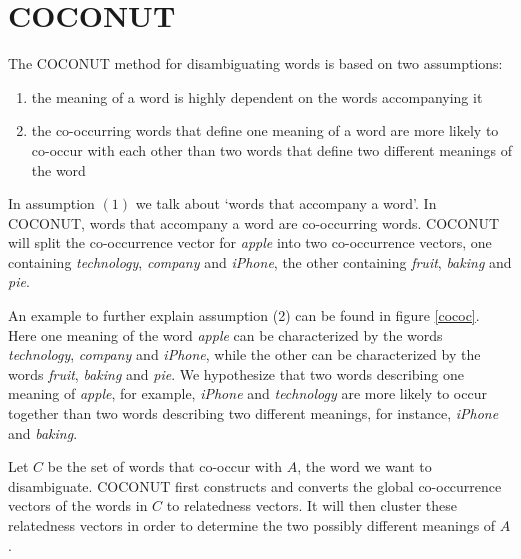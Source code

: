 \documentclass[11pt]{article}
\begin{document}
\section{COCONUT}
\label{anouk}
The COCONUT method for disambiguating words is based on two assumptions: 
\begin{enumerate}
\item the meaning of a word is highly dependent on the words accompanying it
\item the co-occurring words that define one meaning of a word are more likely to co-occur with each other than two words that define two different meanings of the word
\end{enumerate}
In assumption $(1)$ we talk about `words that accompany a word'. In COCONUT, words that accompany a word are co-occurring words. COCONUT will split the co-occurrence vector for \textit{apple} into two co-occurrence vectors, one containing \textit{technology}, \textit{company} and \textit{iPhone}, the other containing \textit{fruit}, \textit{baking} and \textit{pie}. 

An example to further explain assumption (2) can be found in figure \ref{cococ}. Here one meaning of the word \textit{apple} can be characterized by the words \textit{technology}, \textit{company} and \textit{iPhone}, while the other can be characterized by the words \textit{fruit}, \textit{baking} and \textit{pie}. We hypothesize that two words describing one meaning of \textit{apple}, for example, \textit{iPhone} and \textit{technology} are more likely to occur together than two words describing two different meanings, for instance, \textit{iPhone} and \textit{baking}.

Let $C$ be the set of words that co-occur with $A$, the word we want to disambiguate. COCONUT first constructs and converts the global co-occurrence vectors of the words in $C$ to relatedness vectors. It will then cluster these relatedness vectors in order to determine the two possibly different meanings of $A$. 
\end{document}
